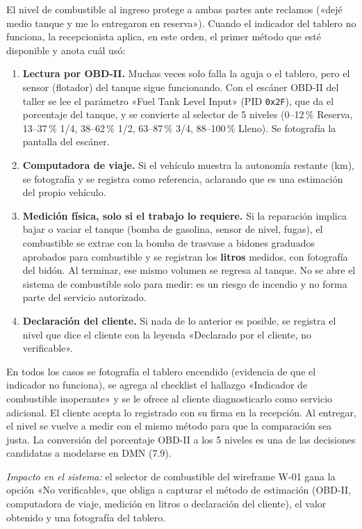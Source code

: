 El nivel de combustible al ingreso protege a ambas partes ante reclamos
(«dejé medio tanque y me lo entregaron en reserva»). Cuando el indicador
del tablero no funciona, la recepcionista aplica, en este orden, el primer
método que esté disponible y anota cuál usó:

\begin{enumerate}
\tightlist
\item \textbf{Lectura por OBD-II.} Muchas veces solo falla la aguja o el
tablero, pero el sensor (flotador) del tanque sigue funcionando. Con el
escáner OBD-II del taller se lee el parámetro «Fuel Tank Level Input» (PID
\texttt{0x2F}), que da el porcentaje del tanque, y se convierte al selector
de 5 niveles (0--12\,\% Reserva, 13--37\,\% 1/4, 38--62\,\% 1/2,
63--87\,\% 3/4, 88--100\,\% Lleno). Se fotografía la pantalla del escáner.
\item \textbf{Computadora de viaje.} Si el vehículo muestra la autonomía
restante (km), se fotografía y se registra como referencia, aclarando que
es una estimación del propio vehículo.
\item \textbf{Medición física, solo si el trabajo lo requiere.} Si la
reparación implica bajar o vaciar el tanque (bomba de gasolina, sensor de
nivel, fugas), el combustible se extrae con la bomba de trasvase a bidones
graduados aprobados para combustible y se registran los \textbf{litros}
medidos, con fotografía del bidón. Al terminar, ese mismo volumen se
regresa al tanque. No se abre el sistema de combustible solo para medir:
es un riesgo de incendio y no forma parte del servicio autorizado.
\item \textbf{Declaración del cliente.} Si nada de lo anterior es posible,
se registra el nivel que dice el cliente con la leyenda «Declarado por el
cliente, no verificable».
\end{enumerate}

En todos los casos se fotografía el tablero encendido (evidencia de que el
indicador no funciona), se agrega al checklist el hallazgo «Indicador de
combustible inoperante» y se le ofrece al cliente diagnosticarlo como
servicio adicional. El cliente acepta lo registrado con su firma en la
recepción. Al entregar, el nivel se vuelve a medir con el mismo método para
que la comparación sea justa. La conversión del porcentaje OBD-II a los 5
niveles es una de las decisiones candidatas a modelarse en DMN (7.9).

\emph{Impacto en el sistema:} el selector de combustible del wireframe W-01
gana la opción «No verificable», que obliga a capturar el método de
estimación (OBD-II, computadora de viaje, medición en litros o declaración
del cliente), el valor obtenido y una fotografía del tablero.

